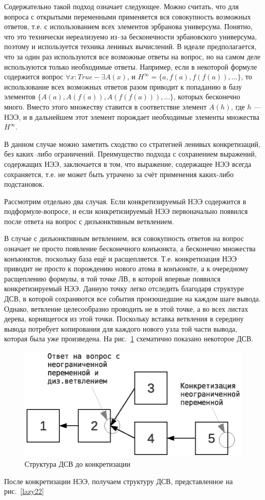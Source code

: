 Содержательно такой подход означает следующее. Можно считать, что для вопроса с открытыми переменными применяется вся совокупность возможных ответов, т.е. с использованием всех элементов эрбранова универсума. Понятно, что это технически нереализуемо из--за бесконечности эрбановского универсума, поэтому и используется техника ленивых вычислений. В идеале предполагается, что за один раз используются все возможные ответы на вопрос, но на самом деле используются только необходимые ответы. Например, если в некоторой формуле содержится вопрос $\forall x: True  - \exists A(x)$, и $H^{\infty}= \{a, f(a), f(f(a)), ...\}$, то использование всех возможных ответов разом приводит к попаданию в базу элементов $\{A(a), A(f(a)), A(f(f(a))), ...\}$, которых бесконечно много. Вместо этого множеству ставится в соответствие элемент $A(h)$, где $h$ --- НЭЭ, и в дальнейшем этот элемент порождает необходимые элементы множества $H^{\infty}$.

В данном случае можно заметить сходство со стратегией ленивых конкретизаций, без каких--либо ограничений. Преимущество подхода с сохранением выражений, содержащих НЭЭ, заключается в том, что выражение, содержащее НЭЭ всегда сохраняется, т.е. не может быть утрачено за счёт применения каких-либо подстановок.

Рассмотрим отдельно два случая. Если конкретизируемый НЭЭ содержится в подформуле-вопросе, и если конкретизируемый НЭЭ первоначально появился после ответа на вопрос с дизъюнктивным ветвлением.

В случае с дизъюнктивным ветвлением, вся совокупность ответов на вопрос означает не просто появление бесконечного конъюнкта, а бесконечно множества конъюнктов, поскольку база ещё и расщепляется. Т.е. конкретизация НЭЭ приводит не просто к порождению нового атома в конъюнкте, а к очередному расщеплению формулы, в той точке ЛВ, в которой впервые появился конкретизируемый НЭЭ. Данную точку легко отследить благодаря структуре ДСВ, в которой сохраняются все события произошедшие на каждом шаге вывода. Однако, ветвление целесообразно проводить не в этой точке, а во всех листах дерева, корнящегося из этой точки. Поскольку вставка ветвления в середину вывода потребует копирования для каждого нового узла той части вывода, которая была уже произведена.  На рис.~\ref{lazy21} схематично показано некоторое ДСВ.
\begin{figure}[h]
	\centering
	\includegraphics[width=0.5\linewidth]{pics/Lazy21.eps}
	\caption{Структура ДСВ до конкретизации}
	\label{lazy21}
\end{figure}
После конкретизации НЭЭ, получаем структуру ДСВ, представленное на рис.~\ref{lazy22}

